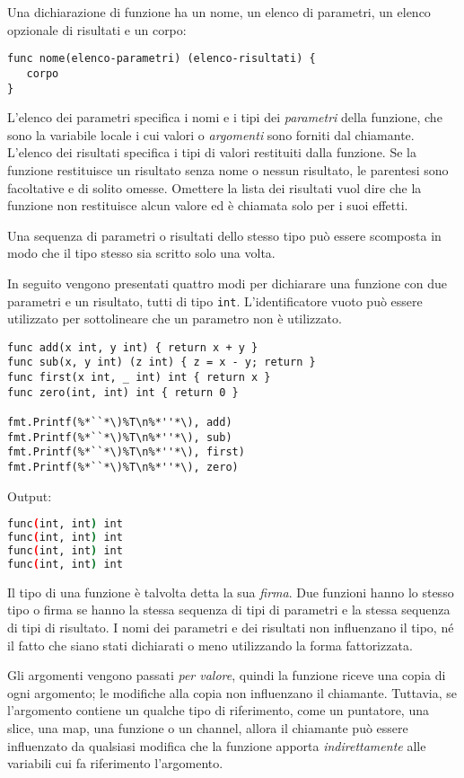 Una dichiarazione di funzione ha un nome, un elenco di parametri, un elenco opzionale di risultati e un corpo:
\begin{lstlisting}[label={lst:lstlisting4-1.1}]
func nome(elenco-parametri) (elenco-risultati) {
   corpo
}
\end{lstlisting}
L'elenco dei parametri specifica i nomi e i tipi dei \textit{parametri} della funzione, che sono la variabile locale i cui valori o \textit{argomenti} sono forniti dal chiamante.
L'elenco dei risultati specifica i tipi di valori restituiti dalla funzione.
Se la funzione restituisce un risultato senza nome o nessun risultato, le parentesi sono facoltative e di solito omesse.
Omettere la lista dei risultati vuol dire che la funzione non restituisce alcun valore ed è chiamata solo per i suoi effetti.

Una sequenza di parametri o risultati dello stesso tipo può essere scomposta in modo che il tipo stesso sia scritto solo una volta.

In seguito vengono presentati quattro modi per dichiarare una funzione con due parametri e un risultato, tutti di tipo \verb|int|.
L'identificatore vuoto può essere utilizzato per sottolineare che un parametro non è utilizzato.
\begin{lstlisting}[frame=single, label={lst:lstlisting4-1.2}]
func add(x int, y int) { return x + y }
func sub(x, y int) (z int) { z = x - y; return }
func first(x int, _ int) int { return x }
func zero(int, int) int { return 0 }

fmt.Printf(%*``*\)%T\n%*''*\), add)
fmt.Printf(%*``*\)%T\n%*''*\), sub)
fmt.Printf(%*``*\)%T\n%*''*\), first)
fmt.Printf(%*``*\)%T\n%*''*\), zero)
\end{lstlisting}
Output:
\begin{lstlisting}[language=bash, frame=L, label={lst:lstlisting4-1.3}]
func(int, int) int
func(int, int) int
func(int, int) int
func(int, int) int
\end{lstlisting}
Il tipo di una funzione è talvolta detta la sua \textit{firma}.
Due funzioni hanno lo stesso tipo o firma se hanno la stessa sequenza di tipi di parametri e la stessa sequenza di tipi di risultato.
I nomi dei parametri e dei risultati non influenzano il tipo, né il fatto che siano stati dichiarati o meno utilizzando la forma fattorizzata.

Gli argomenti vengono passati \textit{per valore}, quindi la funzione riceve una copia di ogni argomento;
le modifiche alla copia non influenzano il chiamante.
Tuttavia, se l'argomento contiene un qualche tipo di riferimento, come un puntatore, una slice, una map, una funzione o un channel, allora il chiamante può essere influenzato da qualsiasi modifica che la funzione apporta \textit{indirettamente} alle variabili cui fa riferimento l'argomento.

